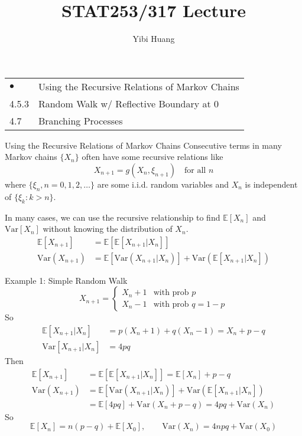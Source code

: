 \documentclass[letterpaper]{beamer}
\title{STAT253/317 Lecture \chapnum}
\date{}
\author{Yibi Huang}
\def\E{\mathbb E}
\def\V{\mathrm{Var}}
\begin{document}
\begin{frame}\maketitle
\begin{center}
\begin{tabular}{ll}
$\bullet$ & Using the Recursive Relations of Markov Chains\\
4.5.3 & Random Walk w/ Reflective Boundary at 0\\
4.7   & Branching Processes
\end{tabular}
\end{center}
\end{frame}
\begin{frame}{Using the Recursive Relations of Markov Chains}
Consecutive terms in many Markov chains $\{X_n\}$ often have some recursive relations like
$$
X_{n+1}= g(X_n, \xi_{n+1})\quad\text{for all }n
$$
where $\{\xi_n, n=0,1,2,\ldots\}$ are some i.i.d. random variables and $X_n$ is independent of $\{\xi_k: k>n\}$.
\par\medskip

In many cases, we can use the recursive relationship to find $\E[X_n]$ and $\V[X_n]$ without knowing the distribution of $X_n$.
\begin{align*}
\E[X_{n+1}]&=\E[\E[X_{n+1}|X_{n}]]\\
\V(X_{n+1})&= \E[\V(X_{n+1}|X_{n})] + \V(\E[X_{n+1}|X_{n}])
\end{align*}
\end{frame}
\begin{frame}{Example 1: Simple Random Walk}
$$
X_{n+1}=
\begin{cases}
X_n + 1 & \text{with prob }p\\
X_n - 1 & \text{with prob }q=1-p
\end{cases}
$$
So
\begin{align*}
\E[X_{n+1}|X_n] &= p (X_n+1) + q(X_n-1) = X_n + p-q\\
\V[X_{n+1}|X_n] &= 4pq
\end{align*}
Then
\begin{align*}
\E[X_{n+1}]&=\E[\E[X_{n+1}|X_n]] = \E[X_n] + p-q\\
\V(X_{n+1})&= \E[\V(X_{n+1}|X_{n})] + \V(\E[X_{n+1}|X_{n}])\\
&=\E[4pq]+\V(X_n + p-q) = 4pq + \V(X_n)
\end{align*}
So
$$
\E[X_n]=n(p-q)+\E[X_0],\qquad \V(X_n) = 4npq + \V(X_0)
$$
\end{frame}
\end{document}
